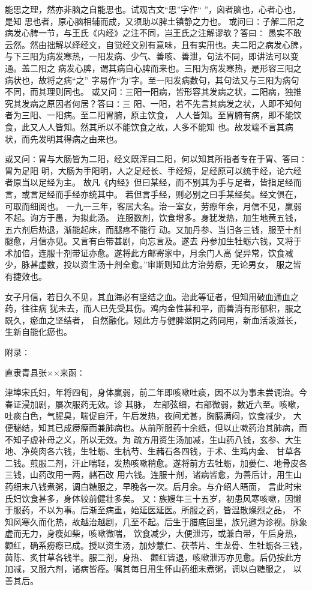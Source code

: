 \documentclass[a4paper,12pt,UTF8,twoside]{ctexbook}
\begin{document}
能思之理，然亦非脑之自能思也。试观古文“思”字作“ ”，囟者脑也，心者心也，是知 
思也者，原心脑相辅而成，又须助以脾土镇静之力也。 
或问曰∶子解二阳之病发心脾一节，与王氏《内经》之注不同，岂王氏之注解谬欤？答曰∶ 
愚实不敢云然。然由拙解以绎经文，自觉经文别有意味，且有实用也。夫二阳之病发心脾， 
与下三阳为病发寒热，一阳发病、少气、善咳、善泄，句法不同，即讲法可以变通。盖二阳之 
病发心脾，谓其病自心脾而来也。三阳为病发寒热，是形容三阳之病状也，故将之病“之” 
字易作“为’字。至一阳发病数句，其句法又与三阳为病句不同，而其理则同也。 
或又问∶三阳一阳病，皆形容其发病之状，二阳病，独推究其发病之原因者何居？答曰∶三 
阳、一阳，若不先言其病发之状，人即不知何者为三阳、一阳病。至二阳胃腑，原主饮食， 
人人皆知。至胃腑有病，即不能饮食，此又人人皆知。然其所以不能饮食之故，人多不能知 
也。故发端不言其病状，而先发明其得病之由来也。 

或又问∶胃与大肠皆为二阳，经文既浑曰二阳，何以知其所指者专在于胃、答曰∶胃为足阳 
明，大肠为手阳明，人之足经长、手经短，足经原可以统手经，论六经者原当以足经为主。 
故凡《内经》但曰某经，而不别其为手与足者，皆指足经而言，或言足经而手经亦统其中。 
若但言手经，则必别之曰手某经矣。经文俱在，可取而细阅也。 
一九一三年，客居大名。治一室女，劳瘵年余，月信不见，羸弱不起。询方于愚，为拟此汤。 
连服数剂，饮食增多。身犹发热，加生地黄五钱，五六剂后热退，渐能起床，而腿疼不能行 
动。又加丹参、当归各三钱，服至十剂腿愈，月信亦见。又言有白带甚剧，向忘言及。遂去 
丹参加生牡蛎六钱，又将于术加倍，连服十剂带证亦愈。遂将此方邮寄家中，月余门人高 
促异常，饮食减少，脉甚虚数，投以资生汤十剂全愈。”审斯则知此方治劳瘵，无论男女， 
服之皆有捷效也。 

女子月信，若日久不见，其血海必有坚结之血。治此等证者，但知用破血通血之药，往往病 
犹未去，而人已先受其伤。鸡内金性甚和平，而善消有形郁积，服之既久，瘀血之坚结者， 
自然融化。矧此方与健脾滋阴之药同用，新血活泼滋长，生新自能化瘀也。 

附录∶ 

直隶青县张××来函∶ 

津埠宋氏妇，年将四旬，身体羸弱，前二年即咳嗽吐痰，因不以为事未尝调治。今春证浸加剧，屡次服药无效。诊 
其脉， 
左部弦细，右部微弱，数近六至。咳嗽，吐痰白色，气腥臭，喘促自汗，午后发热，夜间尤甚，胸膈满闷，饮食减少， 
大便秘结，知其已成痨瘵而兼肺病也。从前所服药十余纸，但以止嗽药治其肺病，而不知子虚补母之义，所以无效。为 
疏方用资生汤加减，生山药八钱，玄参、大生地、净萸肉各六钱，生牡蛎、生杭芍、生赭石各四钱，于术、生鸡内金、 
甘草各二钱。煎服二剂，汗止喘轻，发热咳嗽稍愈。遂将前方去牡蛎，加蒌仁、地骨皮各三钱，山药改用一两，赭石改 
用六钱。连服十剂，诸病皆愈，为善后计，用生山药细末八钱煮粥，调白糖服之，早晚各一次。后月余。与介绍人晤面， 
言此时宋氏妇饮食甚多，身体较前健壮多矣。 
又∶族嫂年三十五岁，初患风寒咳嗽，因懒于服药，不以为事。后渐至病重，始延医延医。所服之药，皆温散燥烈之品， 
不知风寒久而化热，故越治越剧，几至不起。后生于腊底回里，族兄邀为诊视。脉象虚而无力，身瘦如柴，咳嗽微喘， 
饮食减少，大便泄泻，或兼白带，午后身热， 
颧红，确系痨瘵已成。授以资生汤，加炒薏仁、茯苓片、生龙骨、生牡蛎各三钱，茵陈、炙甘草各钱半。服二剂，身热、 
颧红皆退，咳嗽泄泻亦见愈。后仍按此方加减，又服六剂，诸病皆痊。嘱其每日用生怀山药细末煮粥，调以白糖服之， 
以善其后。 
\end{document}
